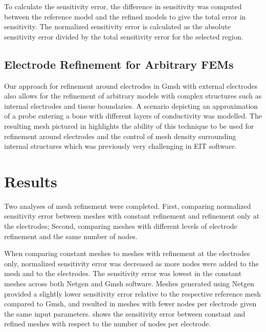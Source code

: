 To calculate the sensitivity error, the difference in sensitivity was computed between the 
reference model and the refined models to give the total error in sensitivity.
The normalized sensitivity error is calculated as the absolute sensitivity error 
divided by the total sensitivity error
for the selected region.


\subsection{Electrode Refinement for Arbitrary FEMs}
Our approach for refinement around electrodes in Gmsh with external electrodes 
also allows for the refinement of arbitrary models with complex structures
such as internal electrodes and tissue boundaries.
A scenario depicting an approximation of 
a probe entering a bone with different 
layers of conductivity was modelled. The resulting mesh pictured in 
highlights the ability of this technique
to be used for refinement around electrodes and the control of mesh density  
surrounding internal structures which was previously
very challenging in EIT software.

\section{Results}

Two analyses of mesh refinement were completed. First, comparing normalized sensitivity error between
meshes with constant refinement and refinement only at the electrodes; Second,
comparing meshes with different levels of electrode refinement and the same number of nodes.

When comparing constant meshes to meshes with refinement at the electrodes only, 
normalized sensitivity error
was decreased as more nodes were added to the mesh and to the electrodes. The sensitivity
error was lowest in the constant meshes across both Netgen and Gmsh software. Meshes 
generated using Netgen
provided a slightly lower sensitivity error relative to the respective reference mesh
compared to Gmsh, and resulted in meshes with fewer nodes per electrode given the same input
parameters.  shows the sensitivity error between
constant and refined meshes with respect to the number of nodes per electrode.  


